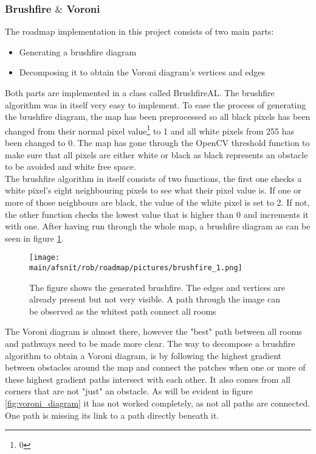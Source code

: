 \documentclass[../../../Main.tex]{subfiles}
\begin{document}
\subsubsection*{Brushfire $\&$ Voroni}
The roadmap implementation in this project consists of two main parts:
\begin{itemize}
  \item Generating a brushfire diagram
  \item Decomposing it to obtain the Voroni diagram's vertices and edges
\end{itemize}
Both parts are implemented in a class called BrushfireAL.
The brushfire algorithm was in itself very easy to implement. To ease the process of generating the brushfire diagram, the map has been preprocessed so all black pixels has been changed from their normal pixel value\footnote{0} to 1 and all white pixels from 255 has been changed to 0.
The map has gone through the OpenCV threshold function to make sure that all pixels are either white or
black as black represents an obstacle to be avoided and white free space. \\
The brushfire algorithm in itself consists of two functions, the first one checks a white pixel's eight neighbouring pixels to see what their pixel value is. If one or more of those neighbours are black, the value of the white pixel is set to 2. If not, the other function checks the lowest value that is higher than 0 and increments it with one.
After having run through the whole map, a brushfire diagram as can be seen in figure \ref{fig:brsuhfire_1}.
\begin{figure}[H]
  \centering
  \texttt{[image: \\main/afsnit/rob/roadmap/pictures/brushfire\_1.png]}
  \caption{The figure shows the generated brushfire. The edges and vertices are already present but not very visible. A path through the image can be observed as the whitest path connect all rooms}
  \label{fig:brsuhfire_1}
\end{figure}
The Voroni diagram is almost there, however the "best" path between all rooms and pathways need to be made more clear.
The way to decompose a brushfire algorithm to obtain a Voroni diagram, is by following the highest gradient between obstacles around the map and connect the patches when one or more of these highest gradient paths intersect with each other. It also comes from all corners that are not "just" an obstacle.
As will be evident in figure \ref{fig:voroni_diagram}
it has not worked completely, as not all paths are connected.
One path is missing its link to a path directly beneath it.
\end{document}
